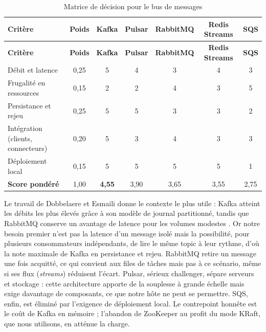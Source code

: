 \renewcommand{\arraystretch}{1.25}
\small
\setlength{\tabcolsep}{4pt}
\begin{xltabular}{\textwidth}{|>{\raggedright\arraybackslash}X|c|c|c|c|c|c|}

\caption{Matrice de décision pour le bus de messages}
\label{tab:broker} \\

\hline
{}
\textbf{Critère} & \textbf{Poids} & \textbf{Kafka} \cite{kafka_docs} & \textbf{Pulsar} \cite{pulsar_docs} & \textbf{RabbitMQ} \cite{rabbitmq_docs} & \textbf{Redis Streams} \cite{redis_streams} & \textbf{SQS} \\ \hline
\endfirsthead

\hline
{}
\textbf{Critère} & \textbf{Poids} & \textbf{Kafka} \cite{kafka_docs} & \textbf{Pulsar} \cite{pulsar_docs} & \textbf{RabbitMQ} \cite{rabbitmq_docs} & \textbf{Redis Streams} \cite{redis_streams} & \textbf{SQS} \\ \hline
\endhead

Débit et latence & 0,25 & 5 & 4 & 3 & 4 & 3 \\ \hline
Frugalité en ressources & 0,15 & 2 & 2 & 4 & 3 & 5 \\ \hline
Persistance et rejeu & 0,25 & 5 & 5 & 3 & 3 & 2 \\ \hline
Intégration (clients, connecteurs) & 0,20 & 5 & 3 & 4 & 3 & 3 \\ \hline
Déploiement local & 0,15 & 5 & 5 & 5 & 5 & 1 \\ \hline
{}
\textbf{Score pondéré} & 1,00 & \textbf{4,55} & 3,90 & 3,65 & 3,55 & 2,75 \\ \hline

\end{xltabular}
Le travail de Dobbelaere et Esmaili donne le contexte le plus utile : Kafka atteint les débits les plus élevés grâce à son modèle de journal partitionné, tandis que RabbitMQ conserve un avantage de latence pour les volumes modestes \cite{dobbelaere2017kafka}. Or notre besoin premier n'est pas la latence d'un message isolé mais la possibilité, pour plusieurs consommateurs indépendants, de lire le même topic à leur rythme, d'où la note maximale de Kafka en persistance et rejeu. RabbitMQ retire un message une fois acquitté, ce qui convient aux files de tâches mais pas à ce scénario, même si ses flux (\textit{streams}) réduisent l'écart. Pulsar, sérieux challenger, sépare serveurs et stockage : cette architecture apporte de la souplesse à grande échelle mais exige davantage de composants, ce que notre hôte ne peut se permettre. SQS, enfin, est éliminé par l'exigence de déploiement local. Le contrepoint honnête est le coût de Kafka en mémoire ; l'abandon de ZooKeeper au profit du mode KRaft, que nous utilisons, en atténue la charge.


